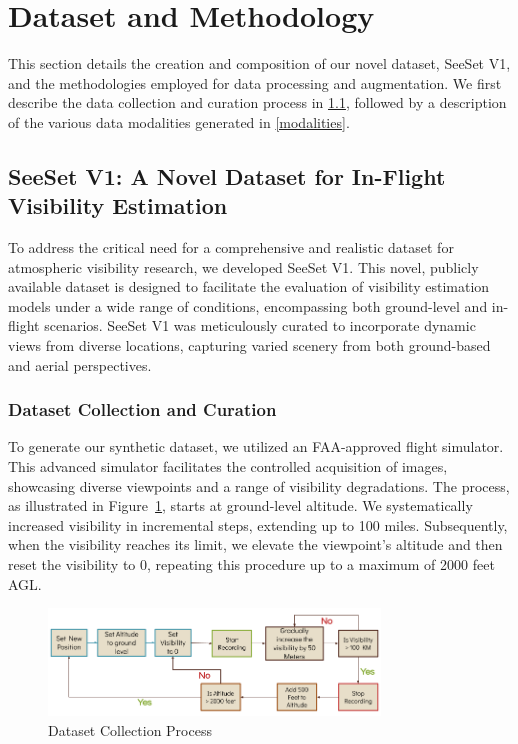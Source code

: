 \section{Dataset and Methodology}
\label{sec:data}

This section details the creation and composition of our novel dataset, SeeSet V1, and the methodologies employed for data processing and augmentation. We first describe the data collection and curation process in \cref{sec:seeset}, followed by a description of the various data modalities generated in \cref{modalities}.

\subsection{SeeSet V1: A Novel Dataset for In-Flight Visibility Estimation}
\label{sec:seeset}
To address the critical need for a comprehensive and realistic dataset for atmospheric visibility research, we developed SeeSet V1. This novel, publicly available dataset is designed to facilitate the evaluation of visibility estimation models under a wide range of conditions, encompassing both ground-level and in-flight scenarios. SeeSet V1 was meticulously curated to incorporate dynamic views from diverse locations, capturing varied scenery from both ground-based and aerial perspectives.

\subsubsection{Dataset Collection and Curation}
\label{data_collection}

To generate our synthetic dataset, we utilized an FAA-approved flight simulator. This advanced simulator facilitates the controlled acquisition of images, showcasing diverse viewpoints and a range of visibility degradations. The process, as illustrated in Figure~\ref{fig:data_collection_process}, starts at ground-level altitude. We systematically increased visibility in incremental steps, extending up to 100 miles. Subsequently, when the visibility reaches its limit, we elevate the viewpoint's altitude and then reset the visibility to 0, repeating this procedure up to a maximum of 2000 feet AGL.

\begin{figure}[htbp]
\centerline{\includegraphics[width=250pt]{imgs/data_collection_pipeline.png}}
\caption{Dataset Collection Process}
\label{fig:data_collection_process}
\end{figure}
 
